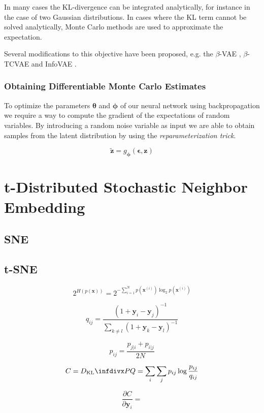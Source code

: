 In many cases the KL-divergence can be integrated analytically, for instance in the case of two Gaussian distributions. In cases where the KL term cannot be solved analytically, Monte Carlo methods are used to approximate the expectation.

Several modifications to this objective have been proposed, e.g. the $\beta$-VAE \cite{beta_vae, understanding_beta_vae}, $\beta$-TCVAE \cite{beta_tcvae} and InfoVAE \cite{infovae}.

\subsubsection{Obtaining Differentiable Monte Carlo Estimates}

To optimize the parameters $\mathbf{\theta}$ and $\mathbf{\phi}$ of our neural network using backpropagation we require a way to compute the gradient of the expectations of random variables. By introducing a random noise variable as input we are able to obtain samples from the latent distribution by using the \textit{reparameterization trick}.

$$\widetilde{\mathbf{z}} = g_{\mathbf{\phi}}(\mathbf{\epsilon}, \mathbf{z})$$

\newpage \phantom{x}
\newpage \phantom{x}
\newpage

\section{t-Distributed Stochastic Neighbor Embedding}
\label{section:tsne}
\subsection{SNE}
\label{subsection:sne}
\newpage

\subsection{t-SNE}
\label{subsection:tsne}

$$2^{H(p(\mathbf{x}))} = 2^{-\sum_{i=1}^{N} p(\mathbf{x}^{(i)}) \log_2 p(\mathbf{x}^{(i)})}$$

$$q_{ij} = \frac{(1 + \mathbf{y}_i - \mathbf{y}_j)^{-1}}{\sum_{k \neq l} (1 + \mathbf{y}_k - \mathbf{y}_l)^{-1}}$$

$$p_{ij} = \frac{p_{j \vert i} + p_{i \vert j}}{2 N}$$

$$C = \dkl{P}{Q} = \sum_i \sum_j p_{ij} \log \frac{p_{ij}}{q_{ij}}$$

$$\frac{\partial C}{\partial \mathbf{y}_i} = $$

